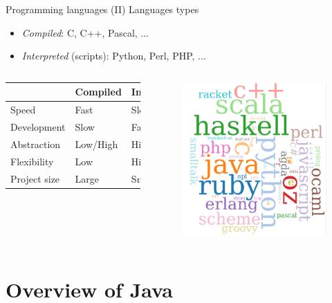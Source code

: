 \documentclass{beamer}
\begin{document}
\begin{frame}{Programming languages (II)}
	Languages types
	\begin{itemize}
		\item \textit{Compiled}: C, C++, Pascal, ...
		\item \textit{Interpreted} (\alert{scripts}): Python, Perl, PHP, ...
 	\end{itemize}

	\begin{columns}
		\begin{tabular}{|l|l|l|}
		\hline
		      		& Compiled 	& Interpreted  \\\hline
		Speed 		& Fast 	 	& Slow 		\\
		Development	& Slow 	 	& Fast 		\\
		Abstraction & Low/High	& High 		\\
		Flexibility & Low		& High 		\\
		Project size& Large		& Small 	\\\hline
		\end{tabular}
		\begin{figure}[t]
		\begin{center}
		    \includegraphics[width=0.7\linewidth]{figs/wordmap.png}
		\end{center}
   	 	\end{figure}
\end{columns}
\end{frame}

\section{Overview of Java}
\end{document}

